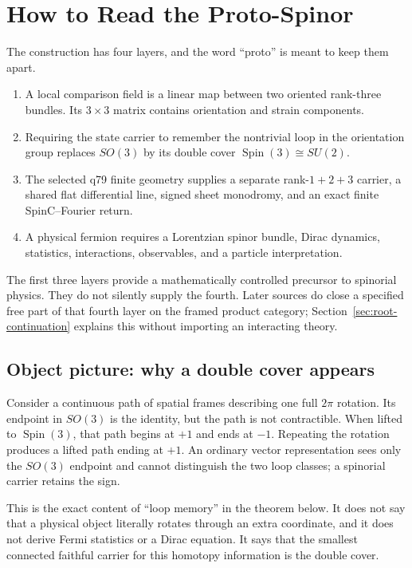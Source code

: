 \documentclass[11pt]{article}
\begin{document}
\tableofcontents

\section{How to Read the Proto-Spinor}

The construction has four layers, and the word ``proto'' is meant to keep
them apart.
\begin{enumerate}
\item A local comparison field is a linear map between two oriented
rank-three bundles.  Its $3\times3$ matrix contains orientation and strain
components.
\item Requiring the state carrier to remember the nontrivial loop in the
orientation group replaces $SO(3)$ by its double cover
$\operatorname{Spin}(3)\cong SU(2)$.
\item The selected q79 finite geometry supplies a separate rank-$1+2+3$
carrier, a shared flat differential line, signed sheet monodromy, and an exact
finite SpinC--Fourier return.
\item A physical fermion requires a Lorentzian spinor bundle, Dirac dynamics,
statistics, interactions, observables, and a particle interpretation.
\end{enumerate}
The first three layers provide a mathematically controlled precursor to
spinorial physics. They do not silently supply the fourth. Later sources do
close a specified free part of that fourth layer on the framed product
category; Section~\ref{sec:root-continuation} explains this without importing
an interacting theory.

\subsection{Object picture: why a double cover appears}

Consider a continuous path of spatial frames describing one full $2\pi$
rotation.  Its endpoint in $SO(3)$ is the identity, but the path is not
contractible.  When lifted to $\operatorname{Spin}(3)$, that path begins at
$+1$ and ends at $-1$.  Repeating the rotation produces a lifted path ending
at $+1$.  An ordinary vector representation sees only the $SO(3)$ endpoint
and cannot distinguish the two loop classes; a spinorial carrier retains the
sign.

This is the exact content of ``loop memory'' in the theorem below.  It does not
say that a physical object literally rotates through an extra coordinate, and
it does not derive Fermi statistics or a Dirac equation.  It says that the
smallest connected faithful carrier for this homotopy information is the
double cover.
\end{document}
